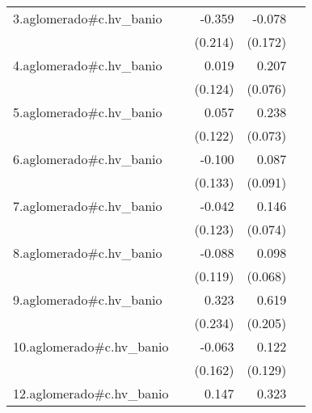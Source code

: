 {\begin{longtable}{l*{4}{D{.}{.}{-1}}}
\addlinespace
3.aglomerado#c.hv\_banio&                     &      -0.359         &      -0.078         &                     \\
            &                     &     (0.214)         &     (0.172)         &                     \\
\addlinespace
4.aglomerado#c.hv\_banio&                     &       0.019         &       0.207\sym{**} &                     \\
            &                     &     (0.124)         &     (0.076)         &                     \\
\addlinespace
5.aglomerado#c.hv\_banio&                     &       0.057         &       0.238\sym{**} &                     \\
            &                     &     (0.122)         &     (0.073)         &                     \\
\addlinespace
6.aglomerado#c.hv\_banio&                     &      -0.100         &       0.087         &                     \\
            &                     &     (0.133)         &     (0.091)         &                     \\
\addlinespace
7.aglomerado#c.hv\_banio&                     &      -0.042         &       0.146\sym{*}  &                     \\
            &                     &     (0.123)         &     (0.074)         &                     \\
\addlinespace
8.aglomerado#c.hv\_banio&                     &      -0.088         &       0.098         &                     \\
            &                     &     (0.119)         &     (0.068)         &                     \\
\addlinespace
9.aglomerado#c.hv\_banio&                     &       0.323         &       0.619\sym{**} &                     \\
            &                     &     (0.234)         &     (0.205)         &                     \\
\addlinespace
10.aglomerado#c.hv\_banio&                     &      -0.063         &       0.122         &                     \\
            &                     &     (0.162)         &     (0.129)         &                     \\
\addlinespace
12.aglomerado#c.hv\_banio&                     &       0.147         &       0.323\sym{**} &                     \\

\end{longtable}}
